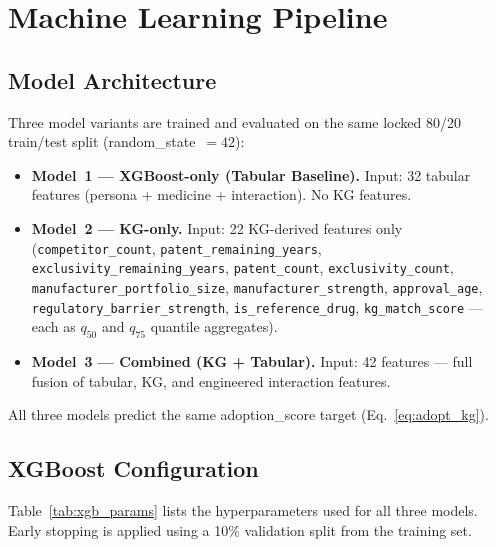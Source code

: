 \documentclass[10pt,journal,compsoc]{IEEEtran}
\begin{document}
\section{Machine Learning Pipeline}
\label{sec:ml}

\subsection{Model Architecture}

Three model variants are trained and evaluated on the same locked 80/20 train/test
split (random\_state~$=42$):

\begin{itemize}
  \item \textbf{Model~1 --- XGBoost-only (Tabular Baseline).}
        Input: 32 tabular features (persona + medicine + interaction). No KG features.

  \item \textbf{Model~2 --- KG-only.}
        Input: 22 KG-derived features only
        (\texttt{competitor\_count}, \texttt{patent\_remaining\_years},
        \texttt{exclusivity\_remaining\_years}, \texttt{patent\_count},
        \texttt{exclusivity\_count}, \texttt{manufacturer\_portfolio\_size},
        \texttt{manufacturer\_strength}, \texttt{approval\_age},
        \texttt{regulatory\_barrier\_strength}, \texttt{is\_reference\_drug},
        \texttt{kg\_match\_score} --- each as $q_{50}$ and $q_{75}$ quantile
        aggregates).

  \item \textbf{Model~3 --- Combined (KG + Tabular).}
        Input: 42 features --- full fusion of tabular, KG, and engineered interaction
        features.
\end{itemize}

All three models predict the same adoption\_score target (Eq.~\ref{eq:adopt_kg}).

\subsection{XGBoost Configuration}

Table~\ref{tab:xgb_params} lists the hyperparameters used for all three models.
Early stopping is applied using a 10\% validation split from the training set.
\end{document}

